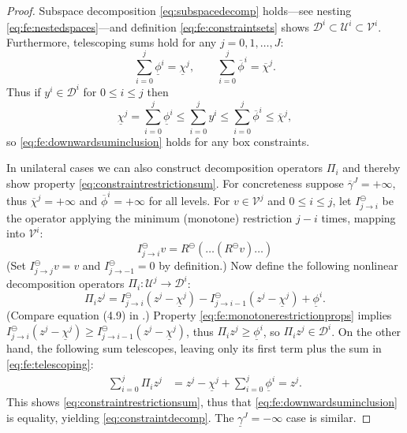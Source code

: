 \documentclass[letterpaper,final,12pt,reqno]{amsart}
\theoremstyle{cstyle}
\theoremstyle{cstyle*}
\theoremstyle{dstyle}
\numberwithin{equation}{section}
\numberwithin{figure}{section}
\numberwithin{table}{section}
\numberwithin{theorem}{section}
\newcommand{\cV}{\mathcal{V}}
\newcommand{\minR}{R^{\bm{\ominus}}}
\begin{document}
\begin{proof}  Subspace decomposition \eqref{eq:subspacedecomp} holds---see nesting \eqref{eq:fe:nestedspaces}---and definition \eqref{eq:fe:constraintsets} shows $\mathcal{D}^i \subset \mathcal{U}^i \subset \cV^i$.  Furthermore, telescoping sums hold for any $j=0,1,\dots,J$:
\begin{equation}
\sum_{i=0}^j \underline{\phi}^i = \underline{\chi}^j, \qquad \sum_{i=0}^j \overline{\phi}^i = \overline{\chi}^j.  \label{eq:fe:telescoping}
\end{equation}
Thus if $y^i \in \mathcal{D}^i$ for $0 \le i \le j$ then
\begin{equation}
\underline{\chi}^j = \sum_{i=0}^j \underline{\phi}^i \le \sum_{i=0}^j y^i \le \sum_{i=0}^j \overline{\phi}^i \le \overline{\chi}^j, \label{eq:fe:lemmaordering}
\end{equation}
so \eqref{eq:fe:downwardsuminclusion} holds for any box constraints.

In unilateral cases we can also construct decomposition operators $\Pi_i$ and thereby show property \eqref{eq:constraintrestrictionsum}.  For concreteness suppose $\overline{\gamma}^J=+\infty$, thus $\overline{\chi}^j=+\infty$ and $\overline{\phi}^i = +\infty$ for all levels.  For $v\in \mathcal{V}^j$ and $0\le i \le j$, let $I_{j\to i}^\ominus$ be the operator applying the minimum (monotone) restriction $j-i$ times, mapping into $\mathcal{V}^i$:
\begin{equation}
I_{j\to i}^\ominus v = \minR(\dots(\minR v)\dots)  \label{eq:fe:minimummaps}
\end{equation}
(Set $I_{j\to j}^\ominus v = v$ and $I_{j\to -1}^\ominus=0$ by definition.)  Now define the following nonlinear decomposition operators $\Pi_i:\mathcal{U}^j \to \mathcal{D}^i$:
\begin{equation}
\Pi_i z^j = I_{j\to i}^\ominus(z^j - \underline{\chi}^j) - I_{j\to i-1}^\ominus(z^j - \underline{\chi}^j) + \underline{\phi}^i.  \label{eq:fe:unilateraldecompositionoperator}
\end{equation}
(Compare equation (4.9) in \cite{GraeserKornhuber2009}.)  Property \eqref{eq:fe:monotonerestrictionprops} implies $I_{j\to i}^\ominus(z^j - \underline{\chi}^j) \ge I_{j\to i-1}^\ominus(z^j - \underline{\chi}^j)$, thus $\Pi_i z^j \ge \underline{\phi}^i$, so $\Pi_i z^j \in \mathcal{D}^i$.  On the other hand, the following sum telescopes, leaving only its first term plus the sum in \eqref{eq:fe:telescoping}:
\begin{align*}
\sum_{i=0}^j \Pi_i z^j &= z^j - \underline{\chi}^j + \sum_{i=0}^j \underline{\phi}^i = z^j.
\end{align*}
This shows \eqref{eq:constraintrestrictionsum}, thus that \eqref{eq:fe:downwardsuminclusion} is equality, yielding \eqref{eq:constraintdecomp}.  The $\underline{\gamma}^J=-\infty$ case is similar.
\end{proof}
\end{document}
